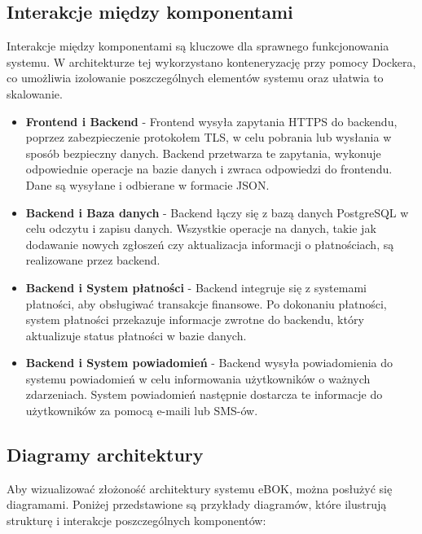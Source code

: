 \subsection{Interakcje między komponentami}

Interakcje między komponentami są kluczowe dla sprawnego funkcjonowania systemu. W architekturze tej wykorzystano konteneryzację przy pomocy Dockera, co umożliwia izolowanie poszczególnych elementów systemu oraz ułatwia to skalowanie.

\begin{itemize} 
	\item \textbf{Frontend i Backend} - Frontend wysyła zapytania HTTPS do backendu, poprzez zabezpieczenie protokołem TLS, w celu pobrania lub wysłania w sposób bezpieczny danych. Backend przetwarza te zapytania, wykonuje odpowiednie operacje na bazie danych i zwraca odpowiedzi do frontendu. Dane są wysyłane i odbierane w formacie JSON.
	
	\item \textbf{Backend i Baza danych} - Backend łączy się z bazą danych PostgreSQL w celu odczytu i zapisu danych. Wszystkie operacje na danych, takie jak dodawanie nowych zgłoszeń czy aktualizacja informacji o płatnościach, są realizowane przez backend.

	\item \textbf{Backend i System płatności} - Backend integruje się z systemami płatności, aby obsługiwać transakcje finansowe. Po dokonaniu płatności, system płatności przekazuje informacje zwrotne do backendu, który aktualizuje status płatności w bazie danych.

	\item \textbf{Backend i System powiadomień} - Backend wysyła powiadomienia do systemu powiadomień w celu informowania użytkowników o ważnych zdarzeniach. System powiadomień następnie dostarcza te informacje do użytkowników za pomocą e-maili lub SMS-ów.

\end{itemize}

\subsection{Diagramy architektury}

Aby wizualizować złożoność architektury systemu eBOK, można posłużyć się diagramami. Poniżej przedstawione są przykłady diagramów, które ilustrują strukturę i interakcje poszczególnych komponentów:

